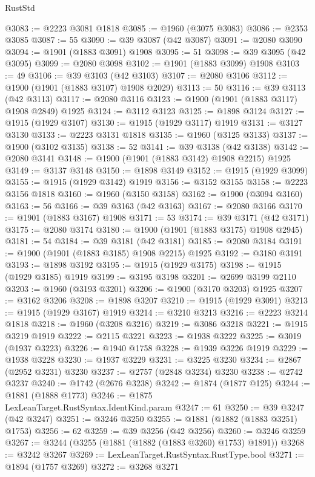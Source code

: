 \begin{lexlean}{RustStd}
\begin{coremodule}
@3083 := @2223 @3081 @1818
@3085 := @1960 (@3075 @3083)
@3086 := @2353 @3085
@3087 := 55
@3090 := @39 @3087 (@42 @3087)
@3091 := @2080 @3090
@3094 := @1901 (@1883 @3091) @1908
@3095 := 51
@3098 := @39 @3095 (@42 @3095)
@3099 := @2080 @3098
@3102 := @1901 (@1883 @3099) @1908
@3103 := 49
@3106 := @39 @3103 (@42 @3103)
@3107 := @2080 @3106
@3112 := @1900 (@1901 (@1883 @3107) @1908 @2029)
@3113 := 50
@3116 := @39 @3113 (@42 @3113)
@3117 := @2080 @3116
@3123 := @1900 (@1901 (@1883 @3117) @1908 @2849) @1925
@3124 := @3112 @3123
@3125 := @1898 @3124
@3127 := @1915 (@1929 @3107)
@3130 := @1915 (@1929 @3117) @1919
@3131 := @3127 @3130
@3133 := @2223 @3131 @1818
@3135 := @1960 (@3125 @3133)
@3137 := @1900 (@3102 @3135)
@3138 := 52
@3141 := @39 @3138 (@42 @3138)
@3142 := @2080 @3141
@3148 := @1900 (@1901 (@1883 @3142) @1908 @2215) @1925
@3149 := @3137 @3148
@3150 := @1898 @3149
@3152 := @1915 (@1929 @3099)
@3155 := @1915 (@1929 @3142) @1919
@3156 := @3152 @3155
@3158 := @2223 @3156 @1818
@3160 := @1960 (@3150 @3158)
@3162 := @1900 (@3094 @3160)
@3163 := 56
@3166 := @39 @3163 (@42 @3163)
@3167 := @2080 @3166
@3170 := @1901 (@1883 @3167) @1908
@3171 := 53
@3174 := @39 @3171 (@42 @3171)
@3175 := @2080 @3174
@3180 := @1900 (@1901 (@1883 @3175) @1908 @2945)
@3181 := 54
@3184 := @39 @3181 (@42 @3181)
@3185 := @2080 @3184
@3191 := @1900 (@1901 (@1883 @3185) @1908 @2215) @1925
@3192 := @3180 @3191
@3193 := @1898 @3192
@3195 := @1915 (@1929 @3175)
@3198 := @1915 (@1929 @3185) @1919
@3199 := @3195 @3198
@3201 := @2699 @3199 @2110
@3203 := @1960 (@3193 @3201)
@3206 := @1900 (@3170 @3203) @1925
@3207 := @3162 @3206
@3208 := @1898 @3207
@3210 := @1915 (@1929 @3091)
@3213 := @1915 (@1929 @3167) @1919
@3214 := @3210 @3213
@3216 := @2223 @3214 @1818
@3218 := @1960 (@3208 @3216)
@3219 := @3086 @3218
@3221 := @1915 @3219 @1919
@3222 := @2115 @3221
@3223 := @1938 @3222
@3225 := @3019 (@1937 @3223)
@3226 := @1940 @1758
@3228 := @1939 @3226 @1919
@3229 := @1938 @3228
@3230 := @1937 @3229
@3231 := @3225 @3230
@3234 := @2867 (@2952 @3231) @3230
@3237 := @2757 (@2848 @3234) @3230
@3238 := @2742 @3237
@3240 := @1742 (@2676 @3238)
@3242 := @1874 (@1877 @125)
@3244 := @1881 (@1888 @1773)
@3246 := @1875 LexLeanTarget.RustSyntax.IdentKind.param
@3247 := 61
@3250 := @39 @3247 (@42 @3247)
@3251 := @3246 @3250
@3255 := @1881 (@1882 (@1883 @3251) @1753)
@3256 := 62
@3259 := @39 @3256 (@42 @3256)
@3260 := @3246 @3259
@3267 := @3244 (@3255 (@1881 (@1882 (@1883 @3260) @1753) @1891))
@3268 := @3242 @3267
@3269 := LexLeanTarget.RustSyntax.RustType.bool
@3271 := @1894 (@1757 @3269)
@3272 := @3268 @3271

\end{coremodule}
\end{lexlean}
